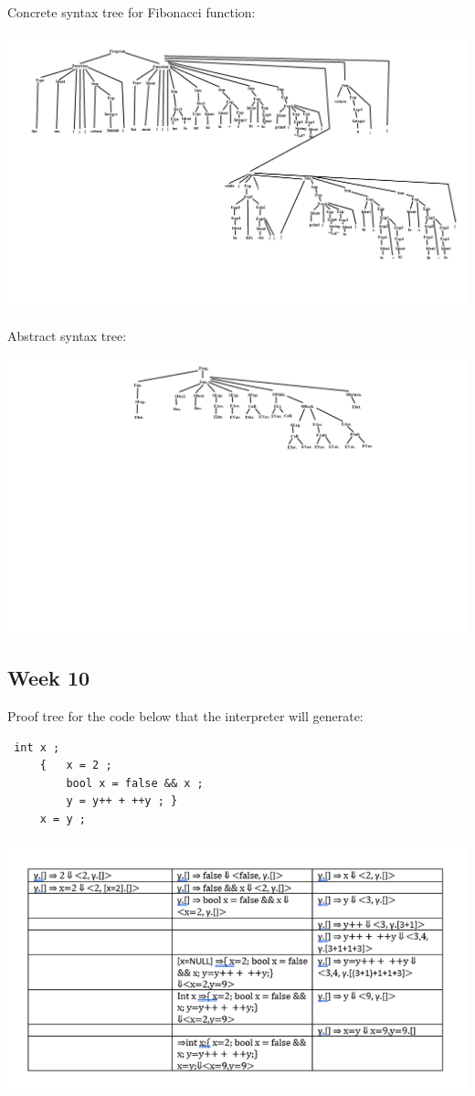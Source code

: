 \documentclass{article}
\theoremstyle{theorem}
\theoremstyle{definition}
\theoremstyle{remark}
\begin{document}
Concrete syntax tree for Fibonacci function:

\includegraphics[scale=0.2]{Images/FibParseTree.png}

Abstract syntax tree:

\includegraphics[scale=0.3]{Images/FibAbstractTree.png}

\subsection{Week 10}

Proof tree for the code below that the interpreter will generate:

\begin{lstlisting}
 int x ;
     {   x = 2 ;
         bool x = false && x ;
         y = y++ + ++y ; }
     x = y ;
\end{lstlisting}

\includegraphics[scale=1.0]{Images/Week10_tree.png}
\end{document}
